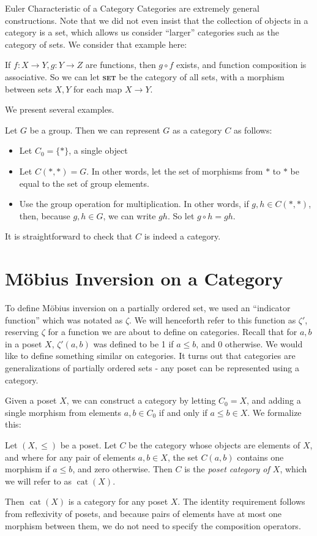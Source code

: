 \documentclass[12pt]{pom_thesis}
\DeclareMathOperator{\cat}{cat}
\newcommand{\catname}[1]{\textbf{\textsc{#1}}}
\begin{document}
\begin{chapter}{Euler Characteristic of a Category}
Categories are extremely general constructions. Note that we did not even insist that the collection of objects in a category is a set, which allows us consider ``larger'' categories such as the category of sets. We consider that example here:
\begin{examp}
If $f:X \rightarrow Y, g:Y\rightarrow Z$ are functions, then $g \circ f$ exists, and function composition is associative. So we can let \catname{set} be the category of all sets, with a morphism between sets $X,Y$ for each map $X \rightarrow Y$. 
\end{examp}

We present several examples.
\begin{examp}
Let $G$ be a group. Then we can represent $G$ as a category $C$ as follows: 
\begin{itemize}
\item Let $C_0 = \{*\}$, a single object
\item Let $C(*, *) = G$. In other words, let the set of morphisms from $*$ to $*$ be equal to the set of group elements. 
\item Use the group operation for multiplication. In other words, if $g,h \in C(*,*)$, then, because $g,h \in G$, we can write $gh$. So let $g \circ h = gh$. 
\end{itemize}
It is straightforward to check that $C$ is indeed a category. 
\end{examp}



\section{M\"obius Inversion on a Category}
To define M\"obius inversion on a partially ordered set, we used an ``indicator function'' which was notated as $\zeta$. We will henceforth refer to this function as $\zeta'$, reserving $\zeta$ for a function we are about to define on categories. Recall that for $a,b$ in a poset $X$, $\zeta'(a,b)$ was defined to be 1 if $a \leq b$, and 0 otherwise. We would like to define something similar on categories. It turns out that categories are generalizations of partially ordered sets - any poset can be represented using a category.

Given a poset $X$, we can construct a category by letting $C_0=X$, and adding a single morphism from elements $a,b \in C_0$ if and only if $a \leq b \in X$. We formalize this:

\begin{defn}\label{cat_poset}
Let $(X, \leq)$ be a poset. Let $C$ be the category whose objects are elements of $X$, and where for any pair of elements $a,b \in X$, the set $C(a,b)$ contains one morphism if $a \leq b$, and zero otherwise. Then $C$ is the \emph{poset category of $X$}, which we will refer to as $\cat(X)$.
\end{defn}
Then $\cat(X)$ is a category for any poset $X$. The identity requirement follows from reflexivity of posets, and because pairs of elements have at most one morphism between them, we do not need to specify the composition operators.


\end{chapter}
\end{document}
